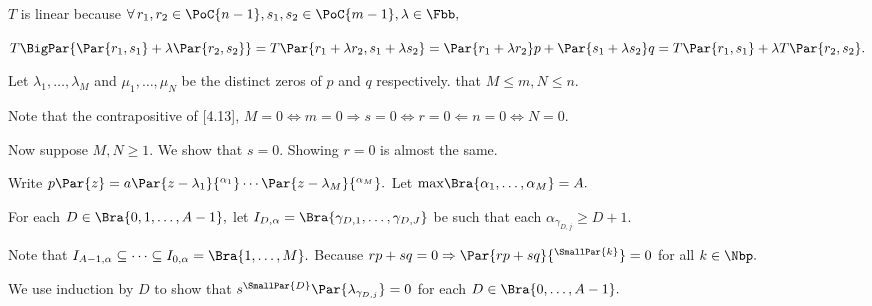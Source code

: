 \par\quad
$T$ is linear because $\forall\,r_1,r_2\in\PoC{n-1},s_1,s_2\in\PoC{m-1},\lambda\in\Fbb,$\par\quad
$T\BigPar{\Par{r_1,s_1}+\lambda\Par{r_2,s_2}}=T\Par{r_1+\lambda r_2,s_1+\lambda s_2}=\Par{r_1+\lambda r_2}p+\Par{s_1+\lambda s_2}q=T\Par{r_1,s_1}+\lambda T\Par{r_2,s_2}.$\par\vspace{6pt}\quad
Let $\lambda_1,\dots,\lambda_M$ and $\mu_1,\dots,\mu_N$ be the distinct zeros of $p$ and $q$ respectively. \NOTICE that $M\leqslant m,N\leqslant n.$\vspace{2pt}\par\quad
Note that the contrapositive of [4.13], $M=0\Longleftrightarrow m=0\Rightarrow s=0\Longleftrightarrow r=0 \Leftarrow n=0\Longleftrightarrow N=0.$\vspace{2pt}\par\quad
Now suppose $M,N\geqslant 1.$ We show that $s=0.$ Showing $r=0$ is almost the same.\vspace{2pt}\par\quad
Write $p\Par{z}=a\Par{z-\lambda_1}{^{\alpha_1}}\cdots\Par{z-\lambda_M}{^{\alpha_M}}.$  Let $\max\!\Bra{\alpha_1,\dots,\alpha_M}=A.$\vspace{2pt}\par\quad
For each $D\in\Bra{0,1,\dots,A-1},$ let $I_{D,\alpha}=\Bra{{\gamma_{D,1}},\dots,{\gamma_{D,J}}}$ be such that each $\alpha_{\gamma_{D,j}}\geqslant D+1.$\vspace{2pt}\par\quad
Note that $I_{A-1,\alpha}\subseteq \cdots\subseteq I_{0,\alpha}=\Bra{1,\dots,M}.$ Because $rp+sq=0\Rightarrow\Par{rp+sq}{^{\SmallPar{k}}}=0$ for all $k\in\Nbp.$\vspace{2pt}\par\quad
We use induction by $D$ to show that $s{^{\SmallPar{D}}}\Par{\lambda_{\gamma_{D,j}}}=0$ for each $D\in\Bra{0,\dots,A-1}.$\vspace{2pt}\par\quad

